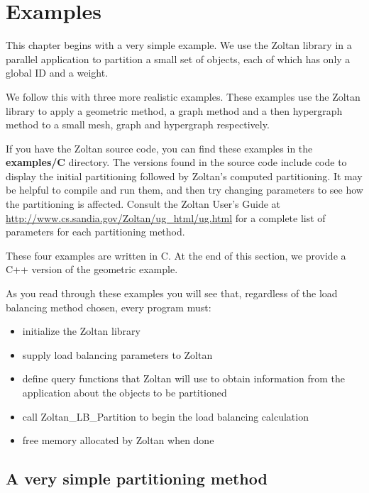 %
%
\chapter{Examples}

This chapter begins with a very simple example.  We use the Zoltan
library in a parallel application to partition a small set of 
objects, each of which has only a global ID and a weight.

We follow this with three more realistic examples.
These examples use the Zoltan library to apply a geometric method,
a graph method and a then hypergraph method to a small mesh, graph
and hypergraph respectively.

If you have the Zoltan source code, you can find these
examples in the \textbf{examples/C} directory.  The versions
found in the source code include code to
display the initial partitioning followed by Zoltan's computed
partitioning.  It may be helpful to compile and run them, and
then try changing parameters 
to see how the partitioning is affected.  Consult the Zoltan
User's Guide at
\url{http://www.cs.sandia.gov/Zoltan/ug_html/ug.html}
for a complete list of parameters for each partitioning method.

These four examples are written in C.  At the end of this section,
we provide a C++ version of the geometric example.

As you read through these examples you will see that, regardless 
of the load balancing method chosen, every program must:

\begin{itemize}
\item initialize the Zoltan library
\item supply load balancing parameters to Zoltan
\item define query functions that Zoltan will use to obtain information from the application about the objects to be partitioned
\item call Zoltan\_LB\_Partition to begin the load balancing calculation
\item free memory allocated by Zoltan when done
\end{itemize}

\clearpage
\section{A very simple partitioning method}

